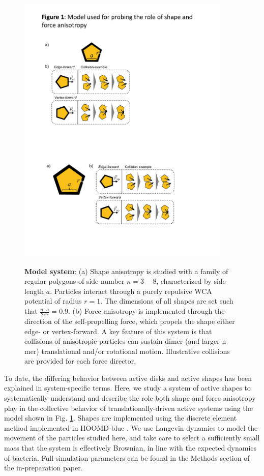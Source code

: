 \begin{figure}[t]
\begin{center}
\includegraphics[width=4in]{../Figures/Fig1.pdf}
\label{fig:model}
\end{center}
\caption{
\textbf{Model system}:
(a) Shape anisotropy is studied with a family of regular polygons of side number $n=3-8$, characterized by side length $a$.
Particles interact through a purely repulsive WCA potential of radius $r=1$.
The dimensions of all shapes are set such that $\frac{n{\cdot}a}{2{\pi}r}=0.9$.
(b) Force anisotropy is implemented through the direction of the self-propelling force, which propels the shape either edge- or vertex-forward.
A key feature of this system is that collisions of anisotropic particles can sustain dimer (and larger n-mer) translational and/or rotational motion.
Illustrative collisions are provided for each force director.
}
\end{figure}

To date, the differing behavior between active disks and active shapes has been explained in system-specific terms. 
Here, we study a system of active shapes to systematically understand and describe the role both shape and force anisotropy play in the collective behavior of translationally-driven active systems using the model shown in Fig. \ref{fig:model}.
Shapes are implemented using the discrete element method \cite{DEM_2017} implemented in HOOMD-blue \cite{HOOMD_2008, HOOMD_2015}.
We use Langevin dynamics to model the movement of the particles studied here, and take care to select a sufficiently small mass that the system is effectively Brownian, in line with the expected dynamics of bacteria.
Full simulation parameters can be found in the Methods section of the in-preparation paper.